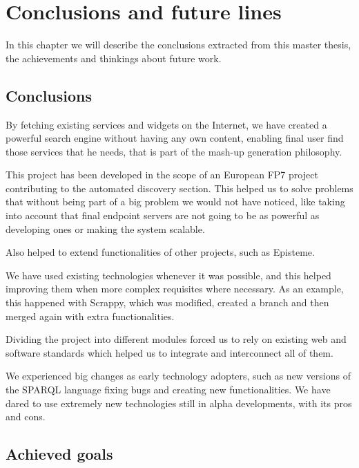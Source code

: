 \chapter{Conclusions and future lines}
\label{chap:conclusions}
\begin{chapterintro}
In this chapter we will describe the conclusions extracted from this master thesis, the achievements and thinkings about future work.
\end{chapterintro}

\cleardoublepage
\section{Conclusions}

By fetching existing services and widgets on the Internet, we have created a powerful search engine without having any own content, enabling final user find those services that he needs, that is part of the mash-up generation philosophy.

This project has been developed in the scope of an European FP7 project contributing to the automated discovery section. This helped us to solve problems that without being part of a big problem we would not have noticed, like taking into account that final endpoint servers are not going to be as powerful as developing ones or making the system scalable.

Also helped to extend functionalities of other projects, such as Episteme.

We have used existing technologies whenever it was possible, and this helped improving them when more complex requisites where necessary. As an example, this happened with Scrappy, which was modified, created a branch and then merged again with extra functionalities.

Dividing the project into different modules forced us to rely on existing web and software standards which helped us to integrate and interconnect all of them.

We experienced big changes as early technology adopters, such as new versions of the SPARQL language fixing bugs and creating new functionalities. We have dared to use extremely new technologies still in alpha developments, with its pros and cons.

\section{Achieved goals}

